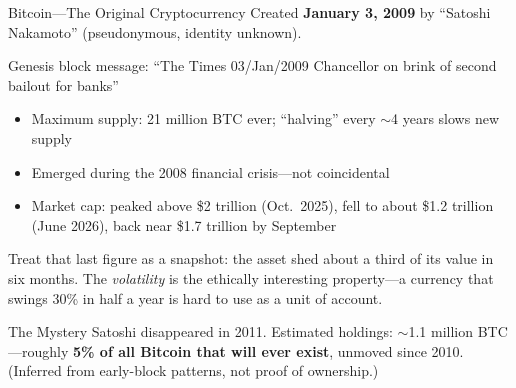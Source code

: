 ﻿\documentclass[aspectratio=169,11pt]{beamer}
\begin{document}
\begin{frame}[shrink=8]{Bitcoin---The Original Cryptocurrency}
Created \textbf{January 3, 2009} by ``Satoshi Nakamoto'' \parencite{nakamoto_bitcoin} (pseudonymous, identity unknown).

\begin{quotebox}
Genesis block message: ``The Times 03/Jan/2009 Chancellor on brink of second bailout for banks''
\end{quotebox}

\begin{itemize}
    \item Maximum supply: 21 million BTC ever; ``halving'' every $\sim$4 years slows new supply
    \item Emerged during the 2008 financial crisis---not coincidental
    \item Market cap: peaked above \$2 trillion (Oct.\ 2025), fell to about \$1.2 trillion (June 2026), back near \$1.7 trillion by September
\end{itemize}

{\scriptsize Treat that last figure as a snapshot: the asset shed about a third of its value in six months. The \emph{volatility} is the ethically interesting property---a currency that swings 30\% in half a year is hard to use as a unit of account.}

\begin{alertblock}{The Mystery}
\scriptsize
Satoshi disappeared in 2011. Estimated holdings: $\sim$1.1 million BTC---roughly \textbf{5\% of all Bitcoin that will ever exist}, unmoved since 2010. (Inferred from early-block patterns, not proof of ownership.)
\end{alertblock}
\end{frame}
\end{document}

